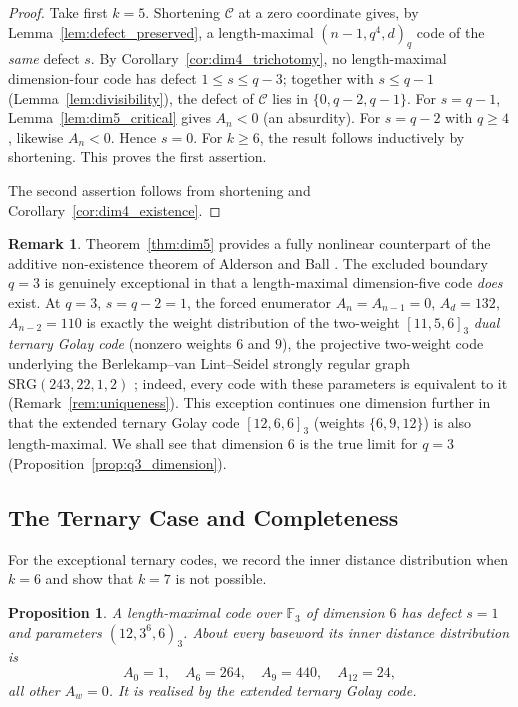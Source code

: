 \documentclass[12pt, letterpaper]{article}
\theoremstyle{plain}
\newtheorem{proposition}[theorem]{Proposition}
\theoremstyle{definition}
\newtheorem{remark}[theorem]{Remark}
\begin{document}
	\begin{proof}
		Take first $k=5$. Shortening $\mathcal C$ at a zero coordinate gives, by Lemma~\ref{lem:defect_preserved}, a length-maximal $(n-1,q^4,d)_q$ code of the \emph{same} defect $s$. By Corollary~\ref{cor:dim4_trichotomy}, no length-maximal dimension-four code has defect $1 \le s \le q-3$; together with $s \le q-1$ (Lemma~\ref{lem:divisibility}), the defect of $\mathcal C$ lies in $\{0, q-2, q-1\}$. For $s = q-1$, Lemma~\ref{lem:dim5_critical} gives $A_n < 0$ (an absurdity). For $s = q-2$ with $q \ge 4$, likewise $A_n < 0$. Hence $s = 0$. For $k \ge 6$, the result follows inductively by shortening. This proves the first assertion.

		The second assertion follows from shortening and Corollary~\ref{cor:dim4_existence}.
	\end{proof}

	\begin{remark}\label{rem:dim5_ball}
		Theorem~\ref{thm:dim5} provides a fully nonlinear counterpart of the additive non-existence theorem of Alderson and Ball \cite{alderson2026setssubspacesrestrictedhyperplane}. The excluded boundary $q = 3$ is genuinely exceptional in that a length-maximal dimension-five code \emph{does} exist. At $q = 3$, $s = q-2 = 1$, the forced enumerator $A_n = A_{n-1} = 0$, $A_d = 132$, $A_{n-2} = 110$ is exactly the weight distribution of the two-weight $[11,5,6]_3$ \emph{dual ternary Golay code} (nonzero weights $6$ and $9$), the projective two-weight code underlying the Berlekamp--van Lint--Seidel strongly regular graph $\mathrm{SRG}(243,22,1,2)$ \cite{CalderbankKantor1986}; indeed, every code with these parameters is equivalent to it (Remark~\ref{rem:uniqueness}). This exception continues one dimension further in that the extended ternary Golay code $[12,6,6]_3$ (weights $\{6,9,12\}$) is also length-maximal. We shall see that dimension $6$ is the true limit for $q=3$ (Proposition~\ref{prop:q3_dimension}).
	\end{remark}

	\subsection{The Ternary Case and Completeness}
	\label{sec:ternary_completeness}

	For the exceptional ternary codes, we record the inner distance distribution when $k=6$ and show that $k=7$ is not possible.
	\begin{proposition}\label{prop:dim6_q3}
		A length-maximal code over $\mathbb{F}_3$ of dimension $6$ has defect $s=1$ and parameters $(12,3^6,6)_3$. About every baseword its inner distance distribution is
		\[
		A_0 = 1, \quad A_6 = 264, \quad A_9 = 440, \quad A_{12} = 24,
		\]
		all other $A_w = 0$. It is realised by the extended ternary Golay code.
	\end{proposition}
\end{document}
